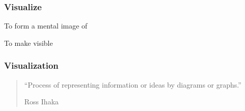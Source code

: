 \documentclass[12pt]{beamer}\usepackage[]{graphicx}\usepackage[]{color}
\begin{document}
{ %
    \begin{frame}[plain]
     \end{frame}
}


\begin{frame}
\frametitle{Visualize}

\bbi
  \item To form a mental image of
  \item To make visible
\ei
\eb

\end{frame}


\begin{frame}
\frametitle{Visualization}

\begin{quotation}
\noindent
``Process of representing information or ideas by diagrams or graphs.''

\bigskip
Ross Ihaka
\end{quotation}

\end{frame}

\end{document}

